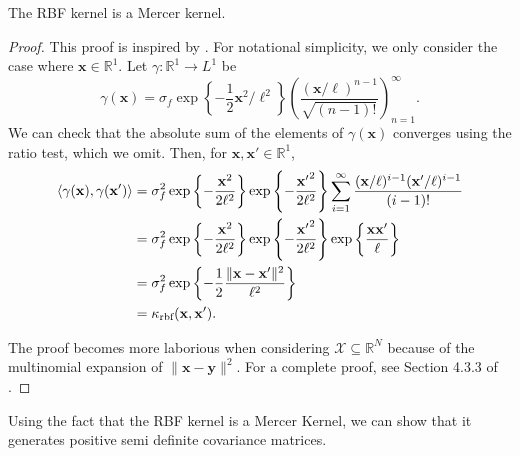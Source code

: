 \begin{theorem}\label{thm:rbf-mercer}
    The RBF kernel is a Mercer kernel.
\end{theorem}
\begin{proof}
    This proof is inspired by \cite{shashua2009}.
    For notational simplicity, we only consider the case where $\mathbf{x} \in \mathbb{R}^{1}$.
    Let $\gamma : \mathbb{R}^{1} \to L^1$ be
    \begin{equation*}
        \gamma(\mathbf{x}) = \sigma_f \exp\left\{-\frac12 \mathbf{x}^2 / \ell^2\right\} \left(\frac{ (\mathbf{x} / \ell)^{n - 1} }{ \sqrt{(n - 1)!} }\right)_{n=1}^{\infty}.
    \end{equation*}
    We can check that the absolute sum of the elements of $\gamma(\mathbf{x})$ converges using the ratio test, which we omit.
    Then, for $\mathbf{x}, \mathbf{x'} \in \mathbb{R}^{1}$,
    \begin{align*}
        \langle \gamma(\mathbf{x}), \gamma(\mathbf{x'}) \rangle
        & = \sigma_f^2
        \exp \left\{ -\frac{\mathbf{x}^2}{2\ell^2} \right\}
        \exp \left\{ -\frac{ \mathbf{x'}^2}{2\ell^2} \right\}
        \sum\limits_{i=1}^{\infty}
        \frac{ (\mathbf{x}/\ell)^{i - 1} (\mathbf{x'}/\ell)^{i - 1}}{ (i - 1)! } \\
        & = \sigma_f^2
        \exp \left\{ -\frac{ \mathbf{x}^2}{2\ell^2} \right\}
        \exp \left\{ -\frac{ \mathbf{x'}^2}{2\ell^2} \right\}
        \exp \left\{ \frac{\mathbf{x} \mathbf{x'}}{ \ell} \right\} \\
        & = \sigma_f^2 \exp \left\{ -\frac12 \frac{ \lVert \mathbf{x} - \mathbf{x'} \rVert^2 }{ \ell^2 } \right\} \\
        & = \kappa_{\text{rbf}}(\mathbf{x}, \mathbf{x'}).
    \end{align*}

    The proof becomes more laborious when considering $\mathcal{X} \subseteq \mathbb{R}^{N}$ because of the multinomial expansion of $\lVert \mathbf{x} - \mathbf{y} \rVert^2$.
    For a complete proof, see Section 4.3.3 of \cite{shashua2009}.
\end{proof}

Using the fact that the RBF kernel is a Mercer Kernel, we can show that it generates positive semi definite covariance matrices.

